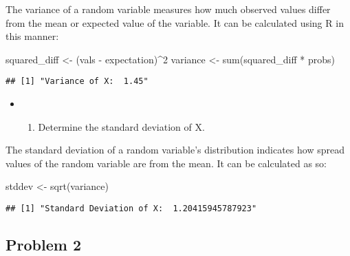 \documentclass[
]{article}
\newenvironment{Shaded}{\begin{snugshade}}{\end{snugshade}}
\newcommand{\DecValTok}[1]{\textcolor[rgb]{0.00,0.00,0.81}{#1}}
\newcommand{\FunctionTok}[1]{\textcolor[rgb]{0.00,0.00,0.00}{#1}}
\newcommand{\NormalTok}[1]{#1}
\newcommand{\OtherTok}[1]{\textcolor[rgb]{0.56,0.35,0.01}{#1}}
\newcommand{\SpecialCharTok}[1]{\textcolor[rgb]{0.00,0.00,0.00}{#1}}
\providecommand{\tightlist}{%
  \setlength{\itemsep}{0pt}\setlength{\parskip}{0pt}}
\begin{document}
\begin{center}
    The variance of a random variable measures how much observed values differ
    from the mean or expected value of the variable. It can be calculated using
    R in this manner:
\end{center}

\begin{Shaded}
\begin{Highlighting}[]
\NormalTok{squared\_diff }\OtherTok{\textless{}{-}}\NormalTok{ (vals }\SpecialCharTok{{-}}\NormalTok{ expectation)}\SpecialCharTok{\^{}}\DecValTok{2}
\NormalTok{variance }\OtherTok{\textless{}{-}} \FunctionTok{sum}\NormalTok{(squared\_diff }\SpecialCharTok{*}\NormalTok{ probs)}
\end{Highlighting}
\end{Shaded}

\begin{verbatim}
## [1] "Variance of X:  1.45"
\end{verbatim}

\hfill\break

\begin{itemize}
\item
  \begin{enumerate}
  \def\labelenumi{\alph{enumi})}
  \setcounter{enumi}{4}
  \tightlist
  \item
    Determine the standard deviation of X.
  \end{enumerate}
\end{itemize}

\begin{center}
    The standard deviation of a random variable's distribution indicates how
    spread values of the random variable are from the mean. It can be calculated
    as so:
\end{center}

\begin{Shaded}
\begin{Highlighting}[]
\NormalTok{stddev }\OtherTok{\textless{}{-}} \FunctionTok{sqrt}\NormalTok{(variance)}
\end{Highlighting}
\end{Shaded}

\begin{verbatim}
## [1] "Standard Deviation of X:  1.20415945787923"
\end{verbatim}

\hfill\break

\hypertarget{problem-2}{%
\subsection{Problem 2}\label{problem-2}}
\end{document}
